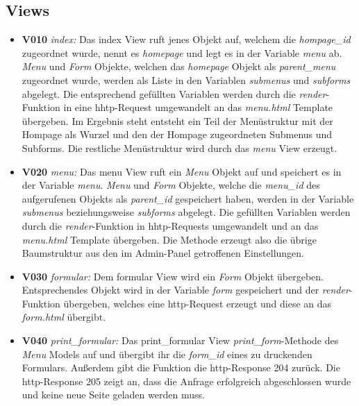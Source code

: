 \subsection{Views}
\begin{itemize}
    \item \textbf{V010} \textit{index:} Das index View ruft jenes Objekt auf, welchem die \textit{hompage\_id} zugeordnet wurde, nennt es \textit{homepage} und legt es in der Variable \textit{menu} ab. \textit{Menu} und \textit{Form} Objekte, welchen das \textit{homepage} Objekt als \textit{parent\_menu} zugeordnet wurde, werden als Liste in den Variablen \textit{submenus} und \textit{subforms} abgelegt. Die entsprechend gefüllten Variablen werden durch die \textit{render}-Funktion in eine hhtp-Request umgewandelt an das \textit{menu.html} Template übergeben. Im Ergebnis steht entsteht ein Teil der Menüstruktur mit der Hompage als Wurzel und den der Hompage zugeordneten Submenus und Subforms. Die restliche Menüstruktur wird durch das \textit{menu} View erzeugt.
    \item \textbf{V020} \textit{menu:} Das menu View ruft ein \textit{Menu} Objekt auf und speichert es in der Variable \textit{menu}. \textit{Menu} und \textit{Form} Objekte, welche die \textit{menu\_id} des aufgerufenen Objekts als \textit{parent\_id} gespeichert haben, werden in der Variable \textit{submenus} beziehungsweise \textit{subforms} abgelegt. Die gefüllten Variablen werden durch die \textit{render}-Funktion in hhtp-Requests umgewandelt und an das \textit{menu.html} Template übergeben. Die Methode erzeugt also die übrige Baumstruktur aus den im Admin-Panel getroffenen Einstellungen.
    \item \textbf{V030} \textit{formular:} Dem formular View wird ein \textit{Form} Objekt übergeben. Entsprechendes Objekt wird in der Variable \textit{form} gespeichert und der \textit{render}-Funktion übergeben, welches eine http-Request erzeugt und diese an das \textit{form.html} übergibt.
    \item \textbf{V040} \textit{print\_formular:} Das print\_formular View \textit{print\_form}-Methode des \textit{Menu} Models auf und übergibt ihr die \textit{form\_id} eines zu druckenden Formulars. Außerdem gibt die Funktion die http-Response 204 zurück. Die http-Response 205 zeigt an, dass die Anfrage erfolgreich abgeschlossen wurde und keine neue Seite geladen werden muss. 
\end{itemize}
\newpage 